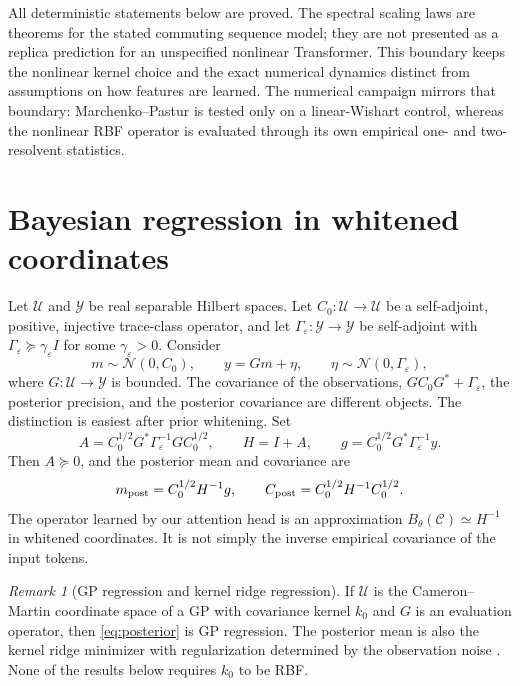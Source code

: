 \documentclass[11pt,a4paper]{article}
\numberwithin{equation}{section}
\theoremstyle{definition}
\theoremstyle{remark}
\newtheorem{remark}[theorem]{Remark}
\newcommand{\calU}{\mathcal U}
\newcommand{\calY}{\mathcal Y}
\newcommand{\calC}{\mathcal C}
\begin{document}
All deterministic statements below are proved.  The spectral scaling laws are
theorems for the stated commuting sequence model; they are not presented as a
replica prediction for an unspecified nonlinear Transformer.  This boundary
keeps the nonlinear kernel choice and the exact numerical dynamics distinct
from assumptions on how features are learned.  The numerical campaign mirrors
that boundary: Marchenko--Pastur is tested only on a linear-Wishart control,
whereas the nonlinear RBF operator is evaluated through its own empirical
one- and two-resolvent statistics.

\section{Bayesian regression in whitened coordinates}
\label{sec:bayes}

Let $\calU$ and $\calY$ be real separable Hilbert spaces.  Let
$C_0:\calU\to\calU$ be a self-adjoint, positive, injective trace-class
operator, and let $\Gamma_\varepsilon:\calY\to\calY$ be self-adjoint with
$\Gamma_\varepsilon\succeq\gamma_\varepsilon I$ for some
$\gamma_\varepsilon>0$.  Consider
\begin{equation}
 m\sim\mathcal N(0,C_0),\qquad
 y=Gm+\eta,\qquad
 \eta\sim\mathcal N(0,\Gamma_\varepsilon),
 \label{eq:linear-model}
\end{equation}
where $G:\calU\to\calY$ is bounded.  The covariance of the observations,
$GC_0G^*+\Gamma_\varepsilon$, the posterior precision, and the posterior covariance are
different objects.  The distinction is easiest after prior whitening.  Set
\begin{equation}
 A=C_0^{1/2}G^*\Gamma_\varepsilon^{-1}GC_0^{1/2},\qquad
 H=I+A,\qquad
 g=C_0^{1/2}G^*\Gamma_\varepsilon^{-1}y.
 \label{eq:whitened-system}
\end{equation}
Then $A\succeq0$, and the posterior mean and covariance are
\begin{equation}
 m_{\rm post}=C_0^{1/2}H^{-1}g,
 \qquad
 C_{\rm post}=C_0^{1/2}H^{-1}C_0^{1/2}.
 \label{eq:posterior}
\end{equation}
The operator learned by our attention head is an approximation
$B_\theta(\calC)\simeq H^{-1}$ in whitened coordinates.  It is not simply the
inverse empirical covariance of the input tokens.

\begin{remark}[GP regression and kernel ridge regression]
If $\calU$ is the Cameron--Martin coordinate space of a GP with covariance
kernel $k_0$ and $G$ is an evaluation operator, then
\eqref{eq:posterior} is GP regression.  The posterior mean is also the kernel
ridge minimizer with regularization determined by the observation noise
\citep{wahba1990spline,rasmussen2006gaussian}.  None of the results below
requires $k_0$ to be RBF.
\end{remark}
\end{document}
